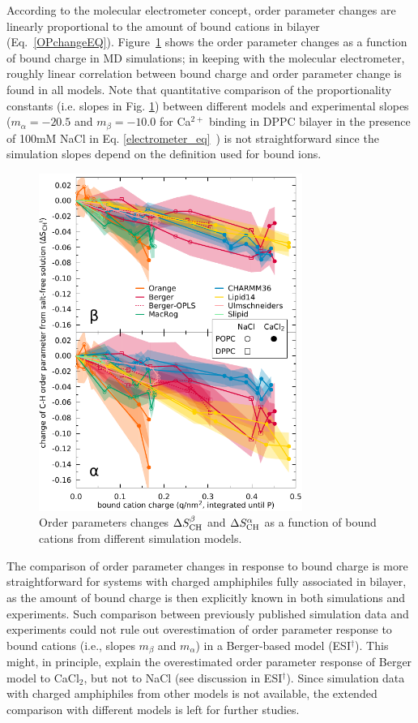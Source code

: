 \documentclass[twoside,twocolumn,9pt]{article}
\begin{document}
According to the molecular electrometer concept, order parameter changes are linearly proportional to
the amount of bound cations in bilayer (Eq.~\eqref{OPchangeEQ}).
Figure~\ref{electrometer} shows the order parameter changes as a function of bound charge in MD simulations;
in keeping with the molecular electrometer, roughly linear correlation between bound charge and order parameter change is found in all models.
Note that quantitative comparison of the proportionality constants (i.e. slopes in Fig. \ref{electrometer})
between different models and experimental slopes
($m_\alpha=-20.5$ and $m_\beta=-10.0$ for Ca$^{2+}$ binding in DPPC bilayer in
the presence of 100mM NaCl in Eq. \ref{electrometer_eq}~\cite{altenbach84}) is not straightforward 
since the simulation slopes depend on the definition used for bound ions. 
\begin{figure}[t]
  \centering
  \includegraphics[width=8.6cm]{../scratch/boundIons/dOP_vs_boundCationCharge_P.pdf}
  \caption{\label{electrometer}
    Order parameters changes $\Delta S_{\rm{CH}}^{\beta}$ and $\Delta S_{\rm{CH}}^{\alpha}$ as a function of bound
    cations from different simulation models.
   }
\end{figure}

The comparison of order parameter changes in response to bound charge is more straightforward for
systems with charged amphiphiles fully associated in bilayer, as the amount of bound charge
is then explicitly known in both simulations and experiments. Such comparison
between previously published simulation data \cite{miettinen09} and experiments \cite{scherer89,franzin98}
could not rule out
overestimation of order parameter response to bound cations (i.e., slopes $m_\beta$ and $m_\alpha$)
in a Berger-based model (ESI$^\dag$).
This might, in principle, explain the overestimated order parameter 
response of Berger model to CaCl$_2$, but not to NaCl (see discussion in ESI$^\dag$).
Since simulation data with charged amphiphiles from other models is not available,
the extended comparison with different models is left for further studies.
\end{document}
